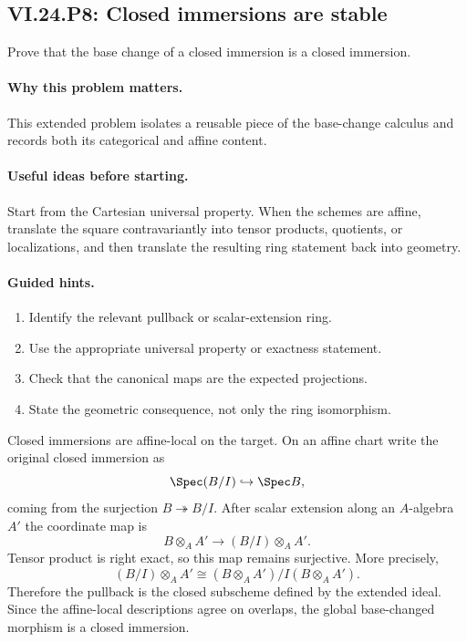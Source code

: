 \subsection*{VI.24.P8: Closed immersions are stable}
\begin{problem}\label{prob:vi24-p08}
Prove that the base change of a closed immersion is a closed immersion.
\end{problem}

\ifdefined\FullProblemDossiers
\paragraph{Why this problem matters.}
This extended problem isolates a reusable piece of the base-change calculus and records both its categorical and affine content.

\paragraph{Useful ideas before starting.}
Start from the Cartesian universal property.  When the schemes are affine, translate the square contravariantly into tensor products, quotients, or localizations, and then translate the resulting ring statement back into geometry.

\paragraph{Guided hints.}
\begin{enumerate}
\item Identify the relevant pullback or scalar-extension ring.
\item Use the appropriate universal property or exactness statement.
\item Check that the canonical maps are the expected projections.
\item State the geometric consequence, not only the ring isomorphism.
\end{enumerate}

\begin{solution}
Closed immersions are affine-local on the target.  On an affine chart write the original closed immersion as
\[
\Spec(B/I)\hookrightarrow\Spec B,
\]
coming from the surjection $B\twoheadrightarrow B/I$.  After scalar extension along an $A$-algebra $A'$ the coordinate map is
\[
B\otimes_AA'\longrightarrow(B/I)\otimes_AA'.
\]
Tensor product is right exact, so this map remains surjective.  More precisely,
\[
(B/I)\otimes_AA'\cong(B\otimes_AA')/I(B\otimes_AA').
\]
Therefore the pullback is the closed subscheme defined by the extended ideal.  Since the affine-local descriptions agree on overlaps, the global base-changed morphism is a closed immersion.
\end{solution}

